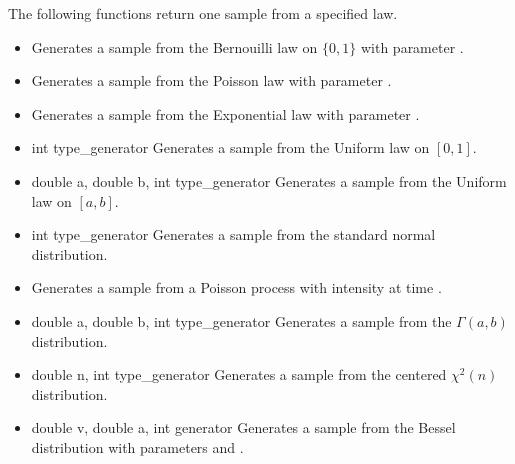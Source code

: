 The following functions return one sample from a specified law.
\begin{itemize}
\item {}
  \sshortdescribe Generates a sample from the Bernouilli law on $\{0, 1\}$ with
  parameter .

\item {}
  \sshortdescribe Generates a sample from the Poisson law with
  parameter .

\item {}
  \sshortdescribe Generates a sample from the Exponential law with
  parameter .

\item {} {int type_generator}
  \sshortdescribe Generates a sample from the Uniform law on $[0, 1]$.

\item {} {double a, double b, int
    type_generator}
  \sshortdescribe Generates a sample from the Uniform law on $[a, b]$.

\item {} {int type_generator}
  \sshortdescribe Generates a sample from the standard normal distribution.

\item {}
  \sshortdescribe Generates a sample from a Poisson process with intensity
   at time .

\item {} {double a, double b, int type_generator}
  \sshortdescribe Generates a sample from the $\Gamma(a, b)$ distribution.

\item {} {double n, int type_generator}
  \sshortdescribe Generates a sample from the centered $\chi^2(n)$ distribution.
\item {} {double v, double a, int generator}
  \sshortdescribe Generates a sample from the Bessel distribution with parameters
   and .
\end{itemize}

